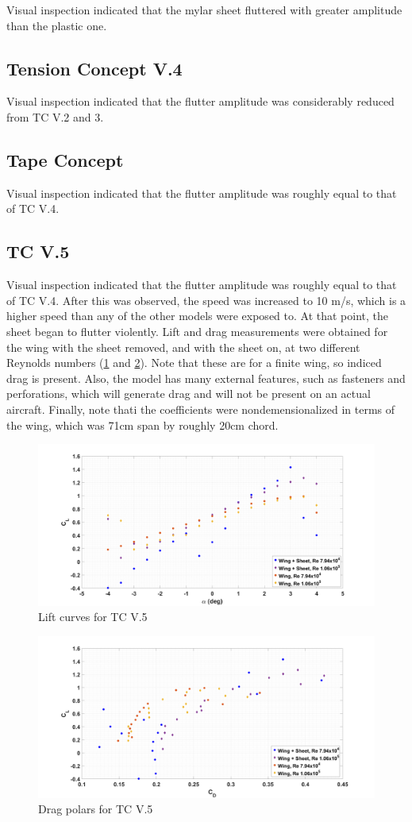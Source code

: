 \documentclass[12pt]{report} %
\begin{document}
Visual inspection indicated that the mylar sheet fluttered with greater amplitude than the plastic one.

\subsection{Tension Concept V.4}

Visual inspection indicated that the flutter amplitude was considerably reduced from TC V.2 and 3.

\subsection{Tape Concept}

Visual inspection indicated that the flutter amplitude was roughly equal to that of TC V.4.

\subsection{TC V.5}

Visual inspection indicated that the flutter amplitude was roughly equal to that of TC V.4. After this was observed, the speed was increased
to 10 m/s, which is a higher speed than any of the other models were exposed to. At that point, the sheet began to flutter violently.
Lift and drag measurements were obtained for
the wing with the sheet removed, and with the sheet on, at two different Reynolds numbers (\ref{tcv5 cl} and \ref{tcv5 dp}). Note that
these are for a finite
wing, so indiced drag is present. Also, the model has many external features, such as fasteners and perforations, which will generate drag and
will not be present on an actual aircraft. Finally, note thati the coefficients were nondemensionalized in terms of the wing, which was 71cm
span by roughly 20cm chord.

\begin{figure}
	\includegraphics[width = 0.5\linewidth]{tcv5_cl.png}
	\caption{Lift curves for TC V.5}
	\label{tcv5 cl}
\end{figure}
\begin{figure}
	\includegraphics[width = 0.5\linewidth]{tcv5_dp.png}
	\caption{Drag polars for TC V.5}
	\label{tcv5 dp}
\end{figure}
\end{document}
